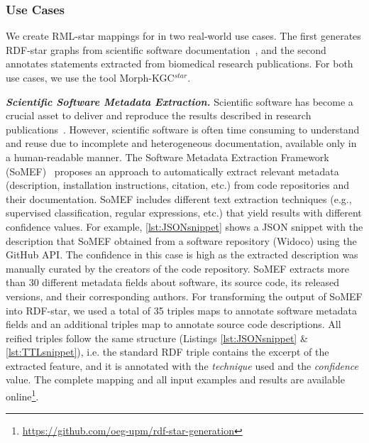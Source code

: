 \subsubsection{Use Cases}
\label{sec:chp4_star_usecases}

We create RML-star mappings for in two real-world use cases. 
The first generates \mbox{RDF-star} graphs from scientific software documentation~\parencite{iglesias2023fair-software-bp}, 
and the second annotates statements extracted from biomedical research publications. 
For both use cases, we use the tool \mbox{Morph-KGC$^{star}$}. 















\noindent\textbf{\textit{Scientific Software Metadata Extraction.}}
Scientific software has become a crucial asset to deliver and reproduce the results described in research publications~\parencite{chue_hong_fair_2021}. However, scientific software is often time consuming to understand and reuse due to incomplete and heterogeneous documentation, available only in a human-readable manner.
The Software Metadata Extraction Framework (SoMEF)~\parencite{somef} proposes an approach to automatically extract relevant metadata (description, installation instructions, citation, etc.) from code repositories and their documentation. SoMEF includes different text extraction techniques (e.g., supervised classification, regular expressions, etc.) that yield results with different confidence values.
For example, \cref{lst:JSONsnippet} shows a JSON snippet with the description that SoMEF obtained from a software repository (Widoco) using the GitHub API.
The confidence in this case is high as the extracted description was manually curated by the creators of the code repository.
SoMEF extracts more than 30 different metadata fields about 
software, its source code, its released versions, and their corresponding authors. For transforming the output of SoMEF into RDF-star, we used a total of 35 triples maps to annotate software metadata fields and an additional triples map to annotate source code descriptions. All reified triples follow the same structure (Listings \ref{lst:JSONsnippet} \& \ref{lst:TTLsnippet}), i.e. the standard RDF triple contains the excerpt of the extracted feature, and it is annotated
with the \emph{technique} used and the \emph{confidence} value. 
The complete mapping and all input examples and results are available online\footnote{\url{https://github.com/oeg-upm/rdf-star-generation}}.
 
